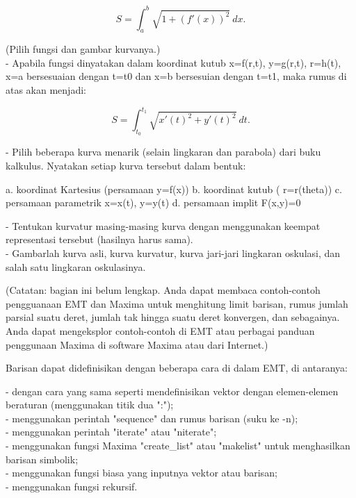 \documentclass{article}
\begin{document}
\begin{eulernotebook}
\begin{eulercomment}
\begin{eulercomment}
\begin{eulercomment}
\begin{eulercomment}
\begin{eulercomment}
\end{eulercomment}
\begin{eulerformula}
\[
S = \int_a^b \sqrt{1+(f'(x))^2} \ dx.
\]
\end{eulerformula}
\begin{eulercomment}
(Pilih fungsi dan gambar kurvanya.)\\
- Apabila fungsi dinyatakan dalam koordinat kutub x=f(r,t), y=g(r,t),
r=h(t), x=a bersesuaian dengan t=t0 dan x=b bersesuian dengan t=t1,
maka rumus di atas akan menjadi:

\end{eulercomment}
\begin{eulerformula}
\[
S=\int_{t_0}^{t_1} \sqrt{x'(t)^2+y'(t)^2}\ dt.
\]
\end{eulerformula}
\begin{eulercomment}
- Pilih beberapa kurva menarik (selain lingkaran dan parabola) dari
buku  kalkulus. Nyatakan setiap kurva tersebut dalam bentuk:\\
\end{eulercomment}
\begin{eulerttcomment}
  a. koordinat Kartesius (persamaan y=f(x))
  b. koordinat kutub ( r=r(theta))
  c. persamaan parametrik x=x(t), y=y(t)
  d. persamaan implit F(x,y)=0
\end{eulerttcomment}
\begin{eulercomment}
- Tentukan kurvatur masing-masing kurva dengan menggunakan keempat
representasi tersebut (hasilnya harus sama).\\
- Gambarlah kurva asli, kurva kurvatur, kurva jari-jari lingkaran
oskulasi, dan salah satu lingkaran oskulasinya.
\end{eulercomment}
\begin{eulercomment}
(Catatan: bagian ini belum lengkap. Anda dapat membaca contoh-contoh
pengguanaan EMT dan Maxima untuk menghitung limit barisan, rumus
jumlah parsial suatu deret, jumlah tak hingga suatu deret konvergen,
dan sebagainya. Anda dapat mengeksplor contoh-contoh di EMT atau
perbagai panduan penggunaan Maxima di software Maxima atau dari
Internet.)

Barisan dapat didefinisikan dengan beberapa cara di dalam EMT, di
antaranya:

- dengan cara yang sama seperti mendefinisikan vektor dengan
elemen-elemen beraturan (menggunakan titik dua ":");\\
- menggunakan perintah "sequence" dan rumus barisan (suku ke -n);\\
- menggunakan perintah "iterate" atau "niterate";\\
- menggunakan fungsi Maxima "create\_list" atau "makelist" untuk
menghasilkan barisan simbolik;\\
- menggunakan fungsi biasa yang inputnya vektor atau barisan;\\
- menggunakan fungsi rekursif.


\end{eulercomment}
\end{eulercomment}
\end{eulercomment}
\end{eulercomment}
\end{eulercomment}
\end{eulernotebook}
\end{document}

